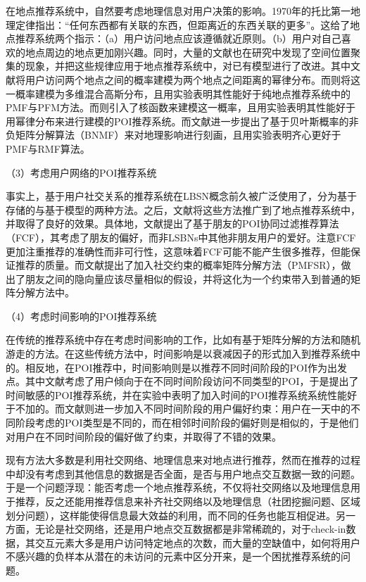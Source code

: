 \documentclass[a4paper,11pt]{article}
\theoremstyle{mytheor}
\begin{document}
在地点推荐系统中，自然要考虑地理信息对用户决策的影响。1970年的托比第一地理定律指出：“任何东西都有关联的东西，但距离近的东西关联的更多”\cite{tobler1970computer}。这给了地点推荐系统两个指示：（a）用户访问地点应该遵循就近原则。（b）用户对自己喜欢的地点周边的地点更加刚兴趣。同时，大量的文献\cite{gao2012gscorr,liu2013learning,ye2011exploiting,yuan2013time,zhang2015igeorec}也在研究中发现了空间位置聚集的现象，并把这些规律应用于地点推荐系统中，对已有模型进行了改进。其中文献\cite{yuan2013time,ye2011exploiting}将用户访问两个地点之间的概率建模为两个地点之间距离的幂律分布。而\cite{cheng2012fused}则将这一概率建模为多维混合高斯分布，且用实验表明其性能好于纯地点推荐系统中的PMF与PFM方法。而\cite{zhang2015igeorec}则引入了核函数来建模这一概率，且用实验表明其性能好于用幂律分布来进行建模的POI推荐系统。而文献\cite{liu2013learning}进一步提出了基于贝叶斯概率的非负矩阵分解算法（BNMF）来对地理影响进行刻画，且用实验表明齐心更好于PMF与RMF算法。

（3）考虑用户网络的POI推荐系统

事实上，基于用户社交关系的推荐系统在LBSN概念前久被广泛使用了，分为基于存储的\cite{golbeck2006generating,massa2007trust,jamali2009trustwalker}与基于模型\cite{jamali2010matrix,ma2008sorec}的两种方法。之后，文献\cite{cheng2012fused,ye2010location}将这些方法推广到了地点推荐系统中，并取得了良好的效果。具体地，文献\cite{ye2010location}提出了基于朋友的POI协同过滤推荐算法（FCF），其考虑了朋友的偏好，而非LSBNs中其他非朋友用户的爱好。注意FCF更加注重推荐的准确性而非可行性，这意味着FCF可能不能产生很多推荐，但能保证推荐的质量。而文献\cite{cheng2012fused}提出了加入社交约束的概率矩阵分解方法（PMFSR），做出了朋友之间的隐向量应该尽量相似的假设，并将这化为一个约束带入到普通的矩阵分解方法中。

（4）考虑时间影响的POI推荐系统

在传统的推荐系统中存在考虑时间影响的工作，比如有基于矩阵分解\cite{koren2010collaborative}的方法和随机游走\cite{xiang2010temporal}的方法。在这些传统方法中，时间影响是以衰减因子的形式加入到推荐系统中的。相反地，在POI推荐中，时间影响则是以推荐不同时间阶段的POI作为出发点。其中文献\cite{yuan2013time}考虑了用户倾向于在不同时间阶段访问不同类型的POI，于是提出了时间敏感的POI推荐系统，并在实验中表明了加入时间的POI推荐系统系统性能好于不加的。而文献\cite{gao2013exploring}则进一步加入不同时间阶段的用户偏好约束：用户在一天中的不同阶段考虑的POI类型是不同的，而在相邻时间阶段的偏好则是相似的，于是他们对用户在不同时间阶段的偏好做了约束，并取得了不错的效果。

现有方法大多数是利用社交网络、地理信息来对地点进行推荐，然而在推荐的过程中却没有考虑到其他信息的数据是否全面，是否与用户地点交互数据一致的问题。于是一个问题浮现：能否考虑一个地点推荐系统，不仅将社交网络以及地理信息用于推荐，反之还能用推荐信息来补齐社交网络以及地理信息（社团挖掘问题、区域划分问题），这样能使得信息最大效益的利用，而不同的任务也能互相促进。另一方面，无论是社交网络，还是用户地点交互数据都是非常稀疏的，对于check-in数据，其交互元素大多是用户访问特定地点的次数，而大量的空缺值中，如何将用户不感兴趣的负样本从潜在的未访问的元素中区分开来，是一个困扰推荐系统的问题。
\end{document}
